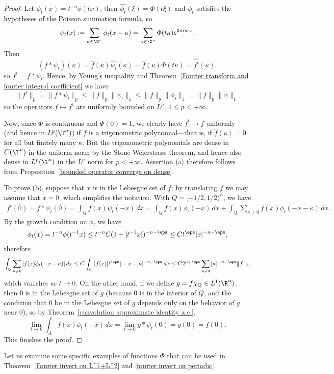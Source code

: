 \begin{proof}
Let $\phi_t(x)=t^{-n}\phi(tx)$, then $\widehat{\phi_t}(\xi)=\Phi(t\xi)$ and $\phi_t$ satisfies the hypotheses of the Poisson summation formula, so
\[\psi_t(x):=\sum_{\kappa\in\Z^n}\phi_t(x-\kappa)=\sum_{\kappa\in\Z^n}\Phi(t\kappa)e^{2\pi i\kappa\cdot x}.\]
Then
\[\widehat{(f\ast\psi_t)}(\kappa)=\hat{f}(\kappa)\hat{\psi_t}(\kappa)=\hat{f}(\kappa)\Phi(t\kappa)=\widehat{f^t}(\kappa).\]
so $f^t=f\ast\psi_t$. Hence, by Young's inequality and Theorem~\ref{Fourier transform and fourier integral coefficient} we have
\[\|f^t\|_p=\|f\ast\psi_t\|_p\leq \|f\|_p\|\psi_t\|_1\leq\|f\|_p\|\phi_t\|_1=\|f\|_p\|\psi\|_1.\]
so the operators $f\mapsto f^t$ are uniformly bounded on $L^p$, $1\leq p<+\infty$.\par
Now, since $\Phi$ is continuous and $\Phi(0)=1$, we clearly have $f^t\to f$ uniformly (and hence in $L^p(\T^n)$) if $f$ is a trigonometric polynomial---that is, if $\hat{f}(\kappa)=0$ for all but finitely many $\kappa$. But the trigonometric polynomials are dense in $C(\T^n)$ in the uniform norm by the Stone-Weierstrass theorem, and hence also dense in $L^p(\T^n)$ in the $L^p$ norm for $p<+\infty$. Assertion (a) therefore follows from Proposition~\ref{bounded operator converge on dense}.\par
To prove (b), suppose that $x$ is in the Lebesgue set of $f$; by translating $f$ we may assume that $x=0$, which simplifies the notation. With $Q=[-1/2,1/2)^n$, we have
\begin{align*}
f^t(0)=f\ast\psi_t(0)=\int_{Q}f(x)\psi_t(-x)\,dx=\int_Qf(x)\phi_t(-x)\,dx+\int_Q\sum_{\kappa\neq 0}f(x)\phi_t(-x-\kappa)\,dx.
\end{align*}
By the growth condition on $\phi$, we have
\[\phi_t(x)=t^{-n}\phi(t^{-1}x)\leq t^{-n}C(1+|t^{-1}x|)^{-n-\eps}\leq Ct^{\eps}|x|^{-n-\eps},\]
therefore
\[\int_Q\sum_{\kappa\neq 0}|f(x)\phi_t(-x-\kappa)|\,dx\leq C\int_Q|f(x)|t^\eps|-x-\kappa|^{-n-\eps}\,dx\leq C2^{n+\eps}\sum_{\kappa\neq 0}|\kappa|^{-n-\eps}\|f\|_1.\]
which vanishes as $t\to 0$. On the other hand, if we define $g=f\chi_Q\in L^1(\R^n)$, then $0$ is in the Lebesgue set of $g$ (because $0$ is in the interior of $Q$, and the condition that $0$ be in the Lebesgue set of $g$ depends only on the behavior of $g$ near $0$), so by Theorem~\ref{convolution approximate identity a.e.}, 
\[\lim_{t\to 0}\int_Af(x)\phi_t(-x)\,dx=\lim_{t\to 0}g\ast\psi_t(0)=g(0)=f(0).\]
This finishes the proof.
\end{proof}
Let us examine some specific examples of functions $\Phi$ that can be used in Theorem~\ref{Fourier invert on L^1+L^2} and \ref{fourier invert on periodic}.
